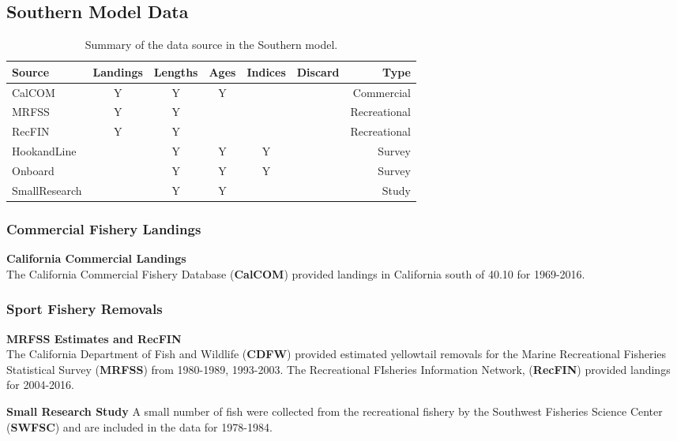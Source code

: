 \documentclass[12pt,]{article}
\begin{document}
\subsection{Southern Model Data}\label{southern-model-data}

\vspace{.5cm}

\begin{table}[ht]
\centering
\caption{Summary of the data source in the Southern model.} 
\label{tab:Data_sources}
\begin{tabular}{lcccccr}
  \hline
Source & Landings & Lengths & Ages & Indices & Discard & Type \\ 
  \hline
CalCOM & Y & Y & Y &  &  & Commercial \\ 
  MRFSS & Y & Y &  &  &  & Recreational \\ 
  RecFIN & Y & Y &  &  &  & Recreational \\ 
  HookandLine &  & Y & Y & Y &  & Survey \\ 
  Onboard &  & Y & Y & Y &  & Survey \\ 
  SmallResearch &  & Y & Y &  &  & Study \\ 
   \hline
\end{tabular}
\end{table}

\subsubsection{Commercial Fishery
Landings}\label{commercial-fishery-landings-1}

\textbf{California Commercial Landings}\\
The California Commercial Fishery Database (\textbf{CalCOM}) provided
landings in California south of 40.10 for 1969-2016.

\subsubsection{Sport Fishery Removals}\label{sport-fishery-removals-1}

\textbf{MRFSS Estimates and RecFIN}\\
The California Department of Fish and Wildlife (\textbf{CDFW}) provided
estimated yellowtail removals for the Marine Recreational Fisheries
Statistical Survey (\textbf{MRFSS}) from 1980-1989, 1993-2003. The
Recreational FIsheries Information Network, (\textbf{RecFIN}) provided
landings for 2004-2016.

\textbf{Small Research Study} A small number of fish were collected from
the recreational fishery by the Southwest Fisheries Science Center
(\textbf{SWFSC}) and are included in the data for 1978-1984.
\end{document}
